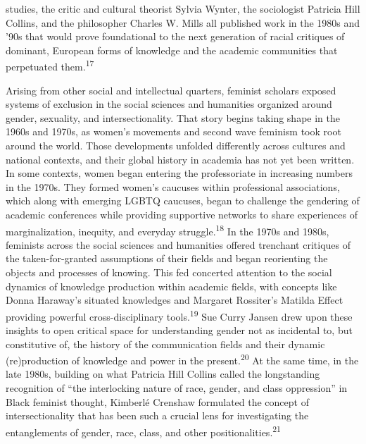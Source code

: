 \documentclass{tufte-handout}
\begin{document}
studies, the critic and cultural theorist Sylvia Wynter, the sociologist
Patricia Hill Collins, and the philosopher Charles W. Mills all
published work in the 1980s and '90s that would prove foundational to
the next generation of racial critiques of dominant, European forms of
knowledge and the academic communities that perpetuated them.\textsuperscript{17}

Arising from other social and intellectual quarters, feminist scholars
exposed systems of exclusion in the social sciences and humanities
organized around gender, sexuality, and intersectionality. That story
begins taking shape in the 1960s and 1970s, as women's movements and
second wave feminism took root around the world. Those developments
unfolded differently across cultures and national contexts, and their
global history in academia has not yet been written. In some contexts,
women began entering the professoriate in increasing numbers in the
1970s. They formed women's caucuses within professional associations,
which along with emerging LGBTQ caucuses, began to challenge the
gendering of academic conferences while providing supportive networks to
share experiences of marginalization, inequity, and everyday
struggle.\textsuperscript{18} In the 1970s
and 1980s, feminists across the social sciences and humanities offered
trenchant critiques of the taken-for-granted assumptions of their fields
and began reorienting the objects and processes of knowing. This fed
concerted attention to the social dynamics of knowledge production
within academic fields, with concepts like Donna Haraway's situated
knowledges and Margaret Rossiter's Matilda Effect providing powerful
cross-disciplinary tools.\textsuperscript{19} Sue Curry Jansen drew upon these insights to open
critical space for understanding gender not as incidental to, but
constitutive of, the history of the communication fields and their
dynamic (re)production of knowledge and power in the present.\textsuperscript{20} At the same time, in the late 1980s, building on what
Patricia Hill Collins called the longstanding recognition of ``the
interlocking nature of race, gender, and class oppression'' in Black
feminist thought, Kimberlé Crenshaw formulated the concept of
intersectionality that has been such a crucial lens for investigating
the entanglements of gender, race, class, and other
positionalities.\textsuperscript{21}
\end{document}
